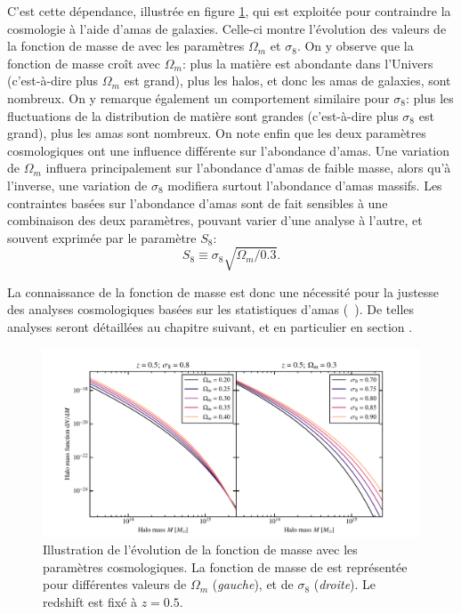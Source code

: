 C'est cette dépendance, illustrée en figure \ref{fig:hmf_cosmo}, qui est exploitée pour contraindre la cosmologie à l'aide d'amas de galaxies.
Celle-ci montre l'évolution des valeurs de la fonction de masse de  avec les paramètres $\Omega_m$ et $\sigma_8$.
On y observe que la fonction de masse croît avec $\Omega_m$: plus la matière est abondante dans l'Univers (c'est-à-dire plus $\Omega_m$ est grand), plus les halos, et donc les amas de galaxies, sont nombreux\footnotemark.
On y remarque également un comportement similaire pour $\sigma_8$: plus les fluctuations de la distribution de matière sont grandes (c'est-à-dire plus $\sigma_8$ est grand), plus les amas sont nombreux.
On note enfin que les deux paramètres cosmologiques ont une influence différente sur l'abondance d'amas.
Une variation de $\Omega_m$ influera principalement sur l'abondance d'amas de faible masse, alors qu'à l'inverse, une variation de $\sigma_8$ modifiera surtout l'abondance d'amas massifs.
Les contraintes basées sur l'abondance d'amas sont de fait sensibles à une combinaison des deux paramètres, pouvant varier d'une analyse à l'autre, et souvent exprimée par le paramètre $S_8$:
\begin{equation}
    S_8 \equiv \sigma_8 \sqrt{\Omega_m/0.3}.
\end{equation}

La connaissance de la fonction de masse est donc une nécessité pour la justesse des analyses cosmologiques basées sur les statistiques d'amas (\eg\ \cite{salvati_impact_2020,artis_impact_2021}).
De telles analyses seront détaillées au chapitre suivant, et en particulier en section .

\begin{figure}[t]
    \centering
    \includegraphics[width=\linewidth]{Figures/Chap_cosmo/hmf_cosmo.pdf}
    \caption{
        Illustration de l'évolution de la fonction de masse avec les paramètres cosmologiques.
        La fonction de masse de  est représentée pour différentes valeurs de $\Omega_m$ (\textit{gauche}), et de $\sigma_8$ (\textit{droite}).
        Le redshift est fixé à $z = 0.5$.
    }
    \label{fig:hmf_cosmo}
\end{figure}

